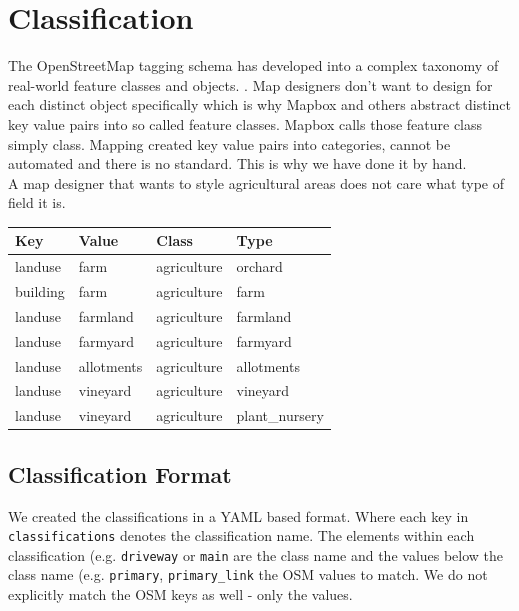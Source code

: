 \section{Classification}
\label{classification}

The OpenStreetMap tagging schema has developed into a complex taxonomy of real-world feature classes and objects. \cite[p. 15]{haklay2008openstreetmap}. Map designers don't want to design
for each distinct object specifically which is why Mapbox and others abstract distinct key value pairs into so called feature classes. Mapbox calls those feature class simply class. Mapping created key value pairs into categories, cannot be automated
and there is no standard. This is why we have done it by hand.
\\
A map designer that wants to style agricultural areas does not care
what type of field it is.

\begin{flushleft}
\begin{tabular}{llll}
Key      & Value      & Class       & Type           \\
\hline
landuse  & farm       & agriculture & orchard        \\
building & farm       & agriculture & farm           \\
landuse  & farmland   & agriculture & farmland       \\
landuse  & farmyard   & agriculture & farmyard       \\
landuse  & allotments & agriculture & allotments     \\
landuse  & vineyard   & agriculture & vineyard       \\
landuse  & vineyard   & agriculture & plant\_nursery
\end{tabular}
\end{flushleft}

\subsection{Classification Format}

We created the classifications in a YAML based format.
Where each key in \texttt{classifications} denotes the classification name. The elements within each classification (e.g. \texttt{driveway} or \texttt{main} are the class name and the values below the class name (e.g. \texttt{primary}, \texttt{primary\_link} the OSM values to match. We do not explicitly match the OSM keys as well - only the values.

